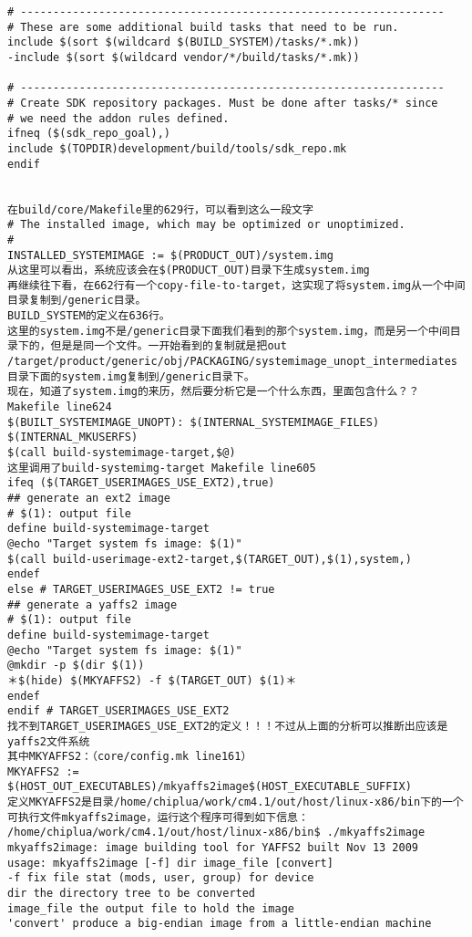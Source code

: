 \documentclass[12pt,a4paper]{article}
\begin{document}
\begin{verbatim}
# -----------------------------------------------------------------
# These are some additional build tasks that need to be run.
include $(sort $(wildcard $(BUILD_SYSTEM)/tasks/*.mk))
-include $(sort $(wildcard vendor/*/build/tasks/*.mk))

# -----------------------------------------------------------------
# Create SDK repository packages. Must be done after tasks/* since
# we need the addon rules defined.
ifneq ($(sdk_repo_goal),)
include $(TOPDIR)development/build/tools/sdk_repo.mk
endif


在build/core/Makefile里的629行，可以看到这么一段文字
# The installed image, which may be optimized or unoptimized.
#
INSTALLED_SYSTEMIMAGE := $(PRODUCT_OUT)/system.img
从这里可以看出，系统应该会在$(PRODUCT_OUT)目录下生成system.img
再继续往下看，在662行有一个copy-file-to-target，这实现了将system.img从一个中间目录复制到/generic目录。
BUILD_SYSTEM的定义在636行。
这里的system.img不是/generic目录下面我们看到的那个system.img，而是另一个中间目录下的，但是是同一个文件。一开始看到的复制就是把out /target/product/generic/obj/PACKAGING/systemimage_unopt_intermediates目录下面的system.img复制到/generic目录下。
现在，知道了system.img的来历，然后要分析它是一个什么东西，里面包含什么？？
Makefile line624
$(BUILT_SYSTEMIMAGE_UNOPT): $(INTERNAL_SYSTEMIMAGE_FILES) $(INTERNAL_MKUSERFS)
$(call build-systemimage-target,$@)
这里调用了build-systemimg-target Makefile line605
ifeq ($(TARGET_USERIMAGES_USE_EXT2),true)
## generate an ext2 image
# $(1): output file
define build-systemimage-target
@echo "Target system fs image: $(1)"
$(call build-userimage-ext2-target,$(TARGET_OUT),$(1),system,)
endef
else # TARGET_USERIMAGES_USE_EXT2 != true
## generate a yaffs2 image
# $(1): output file
define build-systemimage-target
@echo "Target system fs image: $(1)"
@mkdir -p $(dir $(1))
＊$(hide) $(MKYAFFS2) -f $(TARGET_OUT) $(1)＊
endef
endif # TARGET_USERIMAGES_USE_EXT2
找不到TARGET_USERIMAGES_USE_EXT2的定义！！！不过从上面的分析可以推断出应该是yaffs2文件系统
其中MKYAFFS2：（core/config.mk line161）
MKYAFFS2 := $(HOST_OUT_EXECUTABLES)/mkyaffs2image$(HOST_EXECUTABLE_SUFFIX)
定义MKYAFFS2是目录/home/chiplua/work/cm4.1/out/host/linux-x86/bin下的一个可执行文件mkyaffs2image，运行这个程序可得到如下信息：
/home/chiplua/work/cm4.1/out/host/linux-x86/bin$ ./mkyaffs2image
mkyaffs2image: image building tool for YAFFS2 built Nov 13 2009
usage: mkyaffs2image [-f] dir image_file [convert]
-f fix file stat (mods, user, group) for device
dir the directory tree to be converted
image_file the output file to hold the image
'convert' produce a big-endian image from a little-endian machine

\end{verbatim}
\end{document}
